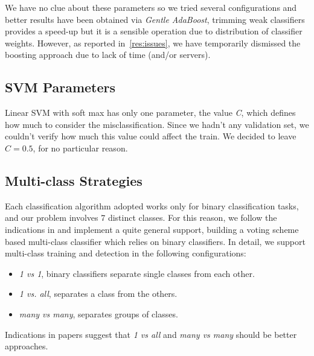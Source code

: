 We have no clue about these parameters so we tried several configurations and better results have been obtained via \emph{Gentle AdaBoost}, trimming weak classifiers provides a speed-up but it is a sensible operation due to distribution of classifier weights. However, as reported in~\ref{res:issues}, we have temporarily dismissed the boosting approach due to lack of time (and/or servers).

\subsection{SVM Parameters}

Linear SVM with soft max has only one parameter, the value \emph{C}, which
defines how much to consider the misclassification. Since we hadn't any
validation set, we couldn't verify how much this value could affect the train.
We decided to leave $C=0.5$, for no particular reason.

\subsection{Multi-class Strategies}

Each classification algorithm adopted works only for binary classification tasks, and our problem involves 7 distinct classes. For this reason, we follow the indications in \cite{Littlewort04dynamicsof, Bartlett06fullyautomatic} and implement a quite general support, building a voting scheme based multi-class classifier which relies on binary classifiers.
In detail, we support multi-class training and detection in the following configurations:

\begin{itemize}
\item \emph{1 vs 1}, binary classifiers separate single classes from each other.
\item \emph{1 vs. all}, separates a class from the others.
\item \emph{many vs many}, separates groups of classes.
\end{itemize}

Indications in papers suggest that \emph{1 vs all} and \emph{many vs many} should be better approaches.